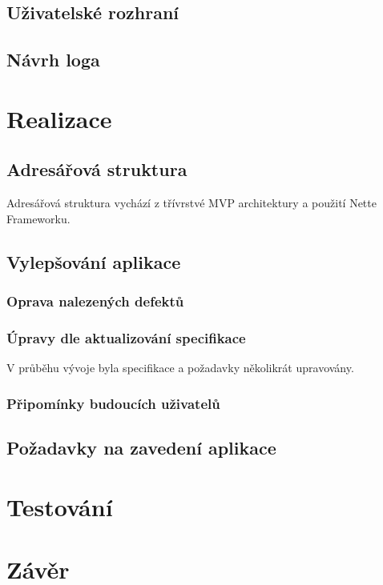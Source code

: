 \documentclass[czech,BP]{thesiskiv}
\begin{document}
	\section{Uživatelské rozhraní}
	\section{Návrh loga}
\chapter{Realizace}
	\section{Adresářová struktura}
	\par Adresářová struktura vychází z třívrstvé MVP architektury a  použití Nette Frameworku.
	
	\section{Vylepšování aplikace}
	\subsection{Oprava nalezených defektů}
	\subsection{Úpravy dle aktualizování specifikace}
	\par V průběhu vývoje byla specifikace a požadavky několikrát upravovány.
	\subsection{Připomínky budoucích uživatelů}
	
	\section{Požadavky na zavedení aplikace}
\chapter{Testování}

\chapter{Závěr}


%
%
\lstlistoflistings

% 
%

{\raggedright\small

}
\end{document}
